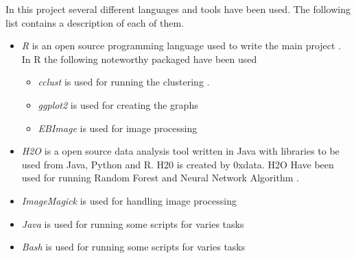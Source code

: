 In this project several different languages and tools have been used. The following list contains a description of each of them. 

\begin{itemize}
	\item \textit{R} is an open source programming language used to write the main project \citealp{RLanguage}. In R the following noteworthy packaged have been used
		\begin{itemize}
			\item \textit{cclust} is used for running the clustering \cite{cclust}.
			\item \textit{ggplot2} is used for creating the graphs
			\item \textit{EBImage} is used for image processing \cite{EBI}
		\end{itemize}
	\item \textit{H2O} is a open source data analysis tool written in Java with libraries to be used from Java, Python and R. H20 is created by 0xdata. H2O Have been used for running Random Forest and Neural Network Algorithm \cite{H2O}.
	\item \textit{ImageMagick} is used for handling image processing \cite{ImgMag}
	\item \textit{Java} is used for running some scripts for varies tasks
	\item \textit{Bash} is used for running some scripts for varies tasks
\end{itemize}
